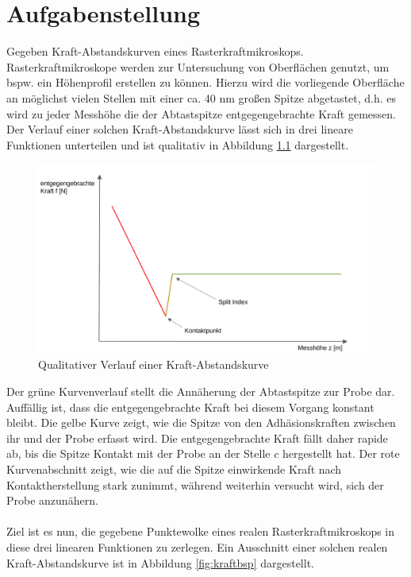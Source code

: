 \chapter{Aufgabenstellung}
Gegeben Kraft-Abstandskurven eines Rasterkraftmikroskops. Rasterkraftmikroskope werden zur Untersuchung von Oberflächen genutzt, um bspw. ein Höhenprofil erstellen zu können. Hierzu wird die vorliegende Oberfläche an möglichst vielen Stellen mit einer ca. 40 nm großen Spitze abgetastet, d.h. es wird zu jeder Messhöhe die der Abtastspitze entgegengebrachte Kraft gemessen.
Der Verlauf einer solchen Kraft-Abstandskurve lässt sich in drei lineare Funktionen unterteilen und ist qualitativ in Abbildung \ref{fig:kraftqual} dargestellt.

\begin{figure}[h!]
\centering
\includegraphics[scale=0.5]{qual.pdf}
\caption{Qualitativer Verlauf einer Kraft-Abstandskurve}
\label{fig:kraftqual}
\end{figure}

Der grüne Kurvenverlauf stellt die Annäherung der Abtastspitze zur Probe dar. Auffällig ist, dass die entgegengebrachte Kraft bei diesem Vorgang konstant bleibt.
Die gelbe Kurve zeigt, wie die Spitze von den Adhäsionskraften zwischen ihr und der Probe erfasst wird. Die entgegengebrachte Kraft fällt daher rapide ab, bis die Spitze Kontakt mit der Probe an der Stelle $c$ hergestellt hat.
Der rote Kurvenabschnitt zeigt, wie die auf die Spitze einwirkende Kraft nach Kontaktherstellung stark zunimmt, während weiterhin versucht wird, sich der Probe anzunähern.
\\\\
Ziel ist es nun, die gegebene Punktewolke eines realen Rasterkraftmikroskops in diese drei linearen Funktionen zu zerlegen.
Ein Ausschnitt einer solchen realen Kraft-Abstandskurve ist in Abbildung \ref{fig:kraftbsp} dargestellt.


